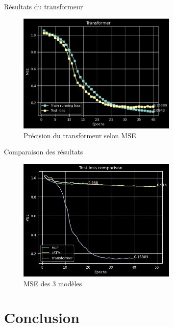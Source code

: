 \documentclass{beamer}
\begin{document}
\begin{frame}{Résultats du transformeur}
\begin{figure} \label{fig:transformer_accuracy}
    \caption{Précision du transformeur selon MSE} \center
    \includegraphics[width=0.7\textwidth]{images/2023-04-02-13-48-49.png}
\end{figure}
\end{frame}

\begin{frame}{Comparaison des résultats}
\begin{figure}
    \caption{MSE des 3 modèles} \center
    \includegraphics[width=0.7\textwidth]{images/comparaison.png}
\end{figure}
\end{frame}

\section{Conclusion}
\end{document}
